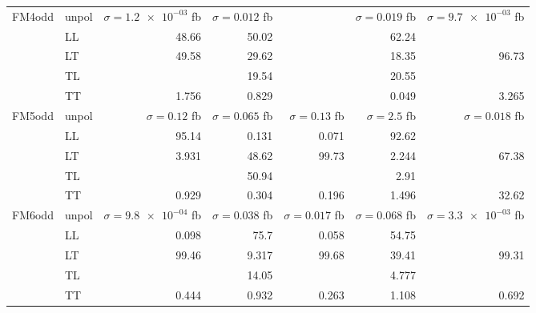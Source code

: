 \begin{table}[h]
{\begin{tabular}{llrrrrr}
\multirow{5}{*}{FM4odd}
 & unpol & $\sigma = \num{1.2e-03}$ fb & $\sigma = \num{0.012}$ fb &  & $\sigma = \num{0.019}$ fb & $\sigma = \num{9.7e-03}$ fb \\
 & LL & \num{48.66} & \num{50.02} &  & \num{62.24} &  \\
 & LT & \num{49.58} & \num{29.62} &  & \num{18.35} & \num{96.73} \\
 & TL &  & \num{19.54} &  & \num{20.55} &  \\
 & TT & \num{1.756} & \num{0.829} &  & \num{0.049} & \num{3.265} \\
\midrule
\multirow{5}{*}{FM5odd}
 & unpol & $\sigma = \num{0.12}$ fb & $\sigma = \num{0.065}$ fb & $\sigma = \num{0.13}$ fb & $\sigma = \num{2.5}$ fb & $\sigma = \num{0.018}$ fb \\
 & LL & \num{95.14} & \num{0.131} & \num{0.071} & \num{92.62} &  \\
 & LT & \num{3.931} & \num{48.62} & \num{99.73} & \num{2.244} & \num{67.38} \\
 & TL &  & \num{50.94} &  & \num{2.91} &  \\
 & TT & \num{0.929} & \num{0.304} & \num{0.196} & \num{1.496} & \num{32.62} \\
\midrule
\multirow{5}{*}{FM6odd}
 & unpol & $\sigma = \num{9.8e-04}$ fb & $\sigma = \num{0.038}$ fb & $\sigma = \num{0.017}$ fb & $\sigma = \num{0.068}$ fb & $\sigma = \num{3.3e-03}$ fb \\
 & LL & \num{0.098} & \num{75.7} & \num{0.058} & \num{54.75} &  \\
 & LT & \num{99.46} & \num{9.317} & \num{99.68} & \num{39.41} & \num{99.31} \\
 & TL &  & \num{14.05} &  & \num{4.777} &  \\
 & TT & \num{0.444} & \num{0.932} & \num{0.263} & \num{1.108} & \num{0.692} \\
\bottomrule
\end{tabular}
}%
\end{table}